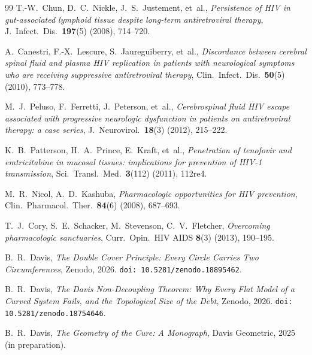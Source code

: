 \documentclass[11pt]{article}
\theoremstyle{plain}
\theoremstyle{definition}
\begin{document}
\begin{thebibliography}{99}
T.-W.~Chun, D.~C.~Nickle, J.~S.~Justement, et~al.,
\textit{Persistence of HIV in gut-associated lymphoid tissue
despite long-term antiretroviral therapy},
J.~Infect.\ Dis.\ \textbf{197}(5) (2008), 714--720.

A.~Canestri, F.-X.~Lescure, S.~Jaureguiberry, et~al.,
\textit{Discordance between cerebral spinal fluid and plasma HIV
replication in patients with neurological symptoms who are
receiving suppressive antiretroviral therapy},
Clin.\ Infect.\ Dis.\ \textbf{50}(5) (2010), 773--778.

M.~J.~Peluso, F.~Ferretti, J.~Peterson, et~al.,
\textit{Cerebrospinal fluid HIV escape associated with progressive
neurologic dysfunction in patients on antiretroviral therapy:
a case series},
J.~Neurovirol.\ \textbf{18}(3) (2012), 215--222.

K.~B.~Patterson, H.~A.~Prince, E.~Kraft, et~al.,
\textit{Penetration of tenofovir and emtricitabine in mucosal
tissues: implications for prevention of HIV-1 transmission},
Sci.\ Transl.\ Med.\ \textbf{3}(112) (2011), 112re4.

M.~R.~Nicol, A.~D.~Kashuba,
\textit{Pharmacologic opportunities for HIV prevention},
Clin.\ Pharmacol.\ Ther.\ \textbf{84}(6) (2008), 687--693.

T.~J.~Cory, S.~E.~Schacker, M.~Stevenson, C.~V.~Fletcher,
\textit{Overcoming pharmacologic sanctuaries},
Curr.\ Opin.\ HIV AIDS \textbf{8}(3) (2013), 190--195.

B.~R.~Davis,
\textit{The Double Cover Principle: Every Circle Carries Two
Circumferences},
Zenodo, 2026.
\texttt{doi:\,10.5281/zenodo.18895462}.

B.~R.~Davis,
\textit{The Davis Non-Decoupling Theorem: Why Every Flat Model
of a Curved System Fails, and the Topological Size of the Debt},
Zenodo, 2026.
\texttt{doi:\,10.5281/zenodo.18754646}.

B.~R.~Davis,
\textit{The Geometry of the Cure: A Monograph},
Davis Geometric, 2025 (in preparation).

\end{thebibliography}
\end{document}
